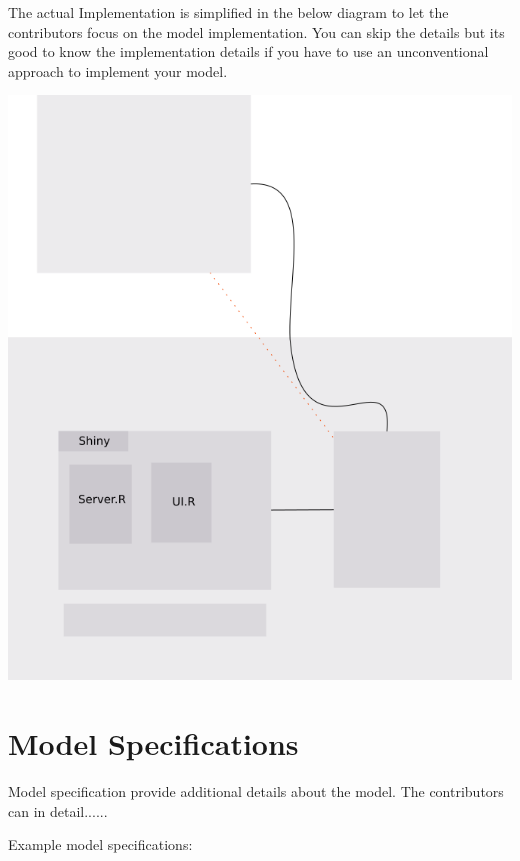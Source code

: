 \documentclass[journal]{IEEEtran}
\begin{document}
The actual Implementation is simplified in the below diagram to let the contributors focus on the model implementation. You can skip the details but its good to know the implementation details if you have to use an unconventional approach to implement your model.

\includegraphics[scale=0.35]{document.png}


\section{Model Specifications}

Model specification provide additional details about the model. The contributors can in detail......


Example model specifications:
\end{document}
